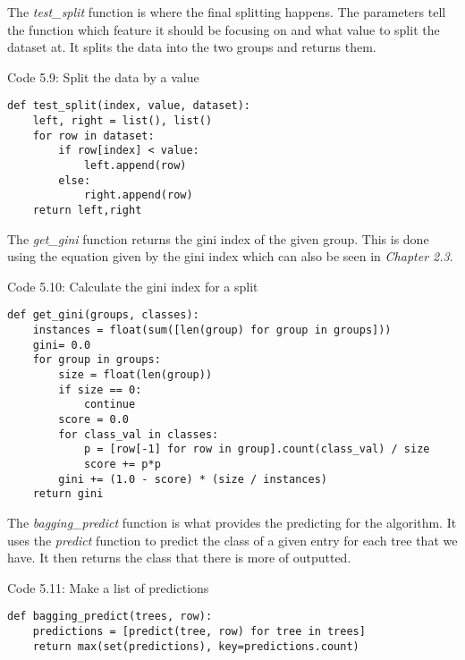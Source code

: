 The \textit{test\_split} function is where the final splitting happens. The parameters tell the function which feature it should be focusing on and what value to split the dataset at. It splits the data into the two groups and returns them.
\begin{center} 
Code 5.9: Split the data by a value
\end{center}
\begin{lstlisting}
def test_split(index, value, dataset):
    left, right = list(), list()
    for row in dataset:
        if row[index] < value:
            left.append(row)
        else:
            right.append(row)
    return left,right
\end{lstlisting}

The \textit{get\_gini} function returns the gini index of the given group. This is done using the equation given by the gini index which can also be seen in \textit{Chapter 2.3}.
\begin{center} 
Code 5.10: Calculate the gini index for a split
\end{center}
\begin{lstlisting}
def get_gini(groups, classes):
    instances = float(sum([len(group) for group in groups]))
    gini= 0.0
    for group in groups:
        size = float(len(group))
        if size == 0:
            continue
        score = 0.0
        for class_val in classes:
            p = [row[-1] for row in group].count(class_val) / size
            score += p*p
        gini += (1.0 - score) * (size / instances)
    return gini
\end{lstlisting}

The \textit{bagging\_predict} function is what provides the predicting for the algorithm. It uses the \textit{predict} function to predict the class of a given entry for each tree that we have. It then returns the class that there is more of outputted. 
\begin{center} 
Code 5.11: Make a list of predictions
\end{center}
\begin{lstlisting}
def bagging_predict(trees, row):
    predictions = [predict(tree, row) for tree in trees]
    return max(set(predictions), key=predictions.count)
\end{lstlisting}

